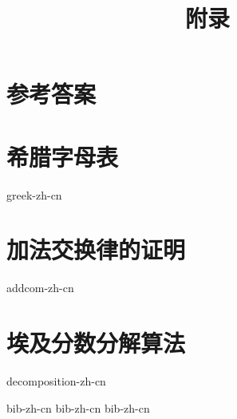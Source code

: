 \documentclass[b5paper]{ctexart}
\begin{document}
\title{附录}

\maketitle
\fi

\chapter{参考答案}
\label{ch:answers}
\shipoutAnswer

\chapter{希腊字母表} \label{ch:greek-letters}
{greek-zh-cn}

\chapter{加法交换律的证明}
{addcom-zh-cn}

\chapter{埃及分数分解算法}
{decomposition-zh-cn}

\markboth{\bibname}{}

\begin{thebibliography}{99}
  {bib-zh-cn}
  {bib-zh-cn}
  {bib-zh-cn}
\end{thebibliography}

\ifx\wholebook\relax \else
\expandafter\enddocument
\fi
\end{document}
